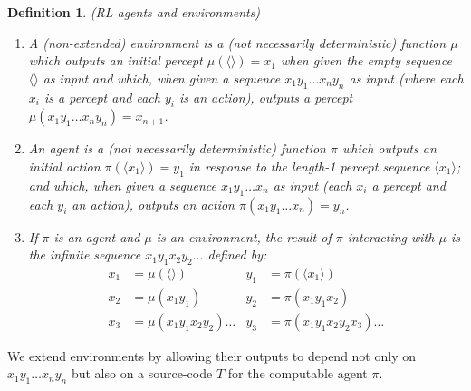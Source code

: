 \documentclass{article}
\newtheorem{mydefinition}[mytheorem]{Definition}
\begin{document}
\begin{mydefinition}
\label{agentenvironmentdefn}
(RL agents and environments)
  \begin{enumerate}
    \item
    A (non-extended) \emph{environment} is a (not necessarily
    deterministic) function $\mu$ which outputs an initial
    percept $\mu(\langle\rangle)=x_1$ when given the empty sequence $\langle\rangle$
    as input
    and which, when given a sequence $x_1y_1\ldots x_ny_n$
    as input (where each $x_i$ is a percept and each
    $y_i$ is an action), outputs a percept
    $\mu(x_1y_1\ldots x_ny_n)=x_{n+1}$.
    \item
    An \emph{agent} is a (not necessarily deterministic)
    function $\pi$ which outputs an initial action $\pi(\langle x_1\rangle)=y_1$
    in response to the length-1 percept sequence $\langle x_1\rangle$;
    and which, when given a sequence $x_1y_1\ldots x_n$ as input
    (each $x_i$ a percept and each $y_i$ an action),
    outputs an action $\pi(x_1y_1\ldots x_n)=y_n$.
    \item
    If $\pi$ is an agent and $\mu$ is an environment, the \emph{result of
    $\pi$ interacting with $\mu$} is the infinite sequence
    $x_1y_1x_2y_2\ldots$ defined by:
    \begin{align*}
      x_1 &= \mu(\langle\rangle) & y_1 &= \pi(\langle x_1\rangle)\\
      x_2 &= \mu(x_1y_1) & y_2 &= \pi(x_1y_1x_2)\\
      x_3 &= \mu(x_1y_1x_2y_2)\ldots & y_3 &= \pi(x_1y_1x_2y_2x_3) \ldots
    \end{align*}
  \end{enumerate}
\end{mydefinition}

We extend environments by allowing their outputs to depend not only on
$x_1y_1\ldots x_ny_n$ but also on a source-code $T$ for the computable agent $\pi$.
\end{document}
